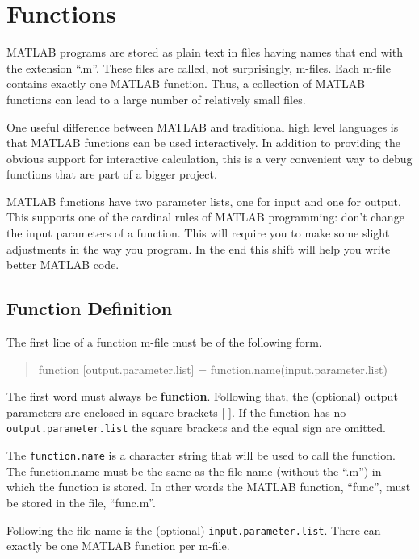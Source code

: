 \documentclass[a4paper,12pt]{article}
\begin{document}
\tableofcontents
\newpage

\section{Functions}
MATLAB programs are stored as plain text in files having names that end with the extension ``.m''. These files are called, not surprisingly, m-files. Each m-file contains exactly one MATLAB function. Thus, a collection of MATLAB functions can lead to a large number of relatively small files.

One useful difference between MATLAB and traditional high level languages is that MATLAB functions can be used interactively. In addition to providing the obvious support for interactive calculation, this is a very convenient way to debug functions that are part of a bigger project.

MATLAB functions have two parameter lists, one for input and one for output. This supports one of the cardinal rules of MATLAB programming: don't change the input parameters of a function.  This will require you to make some slight adjustments in the way you program. In the end this shift will help you write better MATLAB code.

\subsection{Function Definition}

The first line of a function m-file must be of the following form.
   \begin{quote}
    function [output.parameter.list] = function.name(input.parameter.list)
    \end{quote}
The first word must always be \textbf{function}. Following that, the (optional) output parameters are enclosed in square brackets [ ]. If the function has no \texttt{output.parameter.list} the square brackets and the equal sign are omitted. 

The \texttt{function.name} is a character string that will be used to call the function. The function.name must be the same as the file name (without the ``.m'') in which the function is stored. In other words the MATLAB function, ``func'', must be stored in the file, ``func.m''. 

Following the file name is the (optional) \texttt{input.parameter.list}. There can exactly be one MATLAB function per m-file.
\end{document}
